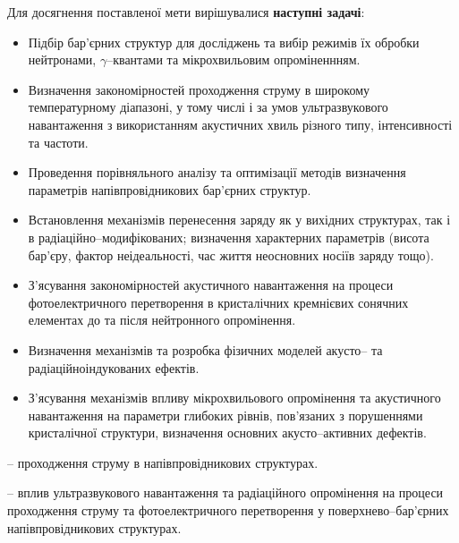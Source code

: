 Для досягнення поставленої мети вирішувалися \textbf{наступні задачі}:
\begin{itemize}[leftmargin=0em,itemindent=1.5em]
\renewcommand{\labelitemi}{$\bullet$}
  \item Підбір бар'єрних структур для досліджень та вибір режимів їх обробки нейтронами, $\gamma$--квантами та мікрохвильовим опроміненнням.

  \item Визначення закономірностей проходження струму в широкому температурному діапазоні, у тому числі і за умов ультразвукового навантаження з використанням акустичних хвиль різного типу, інтенсивності та частоти.

 \item Проведення порівняльного аналізу та оптимізації методів визначення параметрів напівпровідникових бар'єрних структур.

  \item Встановлення механізмів перенесення заряду як у вихідних структурах, так і в радіаційно--модифікованих; визначення характерних параметрів (висота бар'єру, фактор неідеальності, час життя неосновних носіїв заряду тощо).

  \item З'ясування закономірностей акустичного навантаження на процеси фотоелектричного перетворення в кристалічних кремнієвих сонячних елементах до та після нейтронного опромінення.

  \item Визначення механізмів та розробка фізичних моделей акусто-- та радіаційноіндукованих ефектів.

  \item З'ясування механізмів впливу мікрохвильового опромінення та акустичного навантаження на параметри глибоких рівнів, пов'язаних з порушеннями кристалічної структури,
  визначення основних акусто--активних дефектів.

\end{itemize}


{\ObjectTXT} --
проходження струму в напівпровідникових структурах.

{\PredmetTXT}--
вплив ультразвукового навантаження та радіаційного опромінення на
процеси проходження струму та фотоелектричного перетворення у поверхнево--бар'єрних напівпровідникових структурах.


